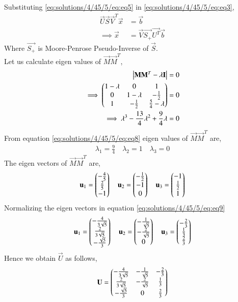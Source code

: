 Substituting \eqref{eq:solutions/4/45/5/eq:eq5} in \eqref{eq:solutions/4/45/5/eq:eq3},
\begin{align}
\vec{U}\vec{S}\vec{V}^T\vec{x} & = \vec{b}\\
\implies\vec{x} &= \vec{V}\vec{S_+}\vec{U^T}\vec{b}\label{eq:solutions/4/45/5/eq:eq7}
\end{align}
Where $\vec{S_+}$ is Moore-Penrose Pseudo-Inverse of $\vec{S}$. \\
Let us calculate eigen values of $\vec{M}\vec{M}^T$,
\begin{align}
\begin{vmatrix}\mathbf{M}\mathbf{M}^T - \lambda\mathbf{I}\end{vmatrix} &= 0\\
\implies\begin{pmatrix}1-\lambda&0&1\\0&1-\lambda&-\frac{1}{2}\\1&-\frac{1}{2}&\frac{5}{4}-\lambda\end{pmatrix} &=0\\
\implies\lambda^3-\frac{13}{4}\lambda^2+\frac{9}{4}\lambda &=0 \label{eq:solutions/4/45/5/eq:eq8}
\end{align}
From equation \eqref{eq:solutions/4/45/5/eq:eq8} eigen values of $\vec{M}\vec{M}^T$ are,
\begin{align}
\lambda_1 = \frac{9}{4} \quad
\lambda_2 = 1 \quad
\lambda_3 = 0
\end{align}
The eigen vectors of $\vec{M}\vec{M}^T$ are,
\begin{align}
\mathbf{u}_1=\begin{pmatrix}-\frac{4}{5}\\\frac{2}{5}\\-1\end{pmatrix}\quad
\mathbf{u}_2=\begin{pmatrix}-\frac{1}{2}\\-1\\0\end{pmatrix}\quad
\mathbf{u}_3=\begin{pmatrix}-1\\\frac{1}{2}\\1\end{pmatrix}\label{eq:solutions/4/45/5/eq:eq9}
\end{align}
Normalizing the eigen vectors in equation \eqref{eq:solutions/4/45/5/eq:eq9}
\begin{align}
\mathbf{u}_1=\begin{pmatrix}-\frac{4}{3\sqrt{5}}\\\frac{2}{3\sqrt{5}}\\-\frac{\sqrt{5}}{3}\end{pmatrix}\quad
\mathbf{u}_2=\begin{pmatrix}-\frac{1}{\sqrt{5}}\\-\frac{2}{\sqrt{5}}\\0\end{pmatrix}\quad
\mathbf{u}_3=\begin{pmatrix}-\frac{2}{3}\\\frac{1}{3}\\\frac{2}{3}\end{pmatrix}
\end{align}
Hence we obtain $\vec{U}$ as follows,
\begin{align}
\mathbf{U}=\begin{pmatrix}-\frac{4}{3\sqrt{5}}&-\frac{1}{\sqrt{5}}&-\frac{2}{3}\\\frac{2}{3\sqrt{5}}&-\frac{2}{\sqrt{5}}&\frac{1}{3}\\
-\frac{\sqrt{5}}{3}&0&\frac{2}{3}\end{pmatrix}\label{eq:solutions/4/45/5/eq:eq10}
\end{align}
